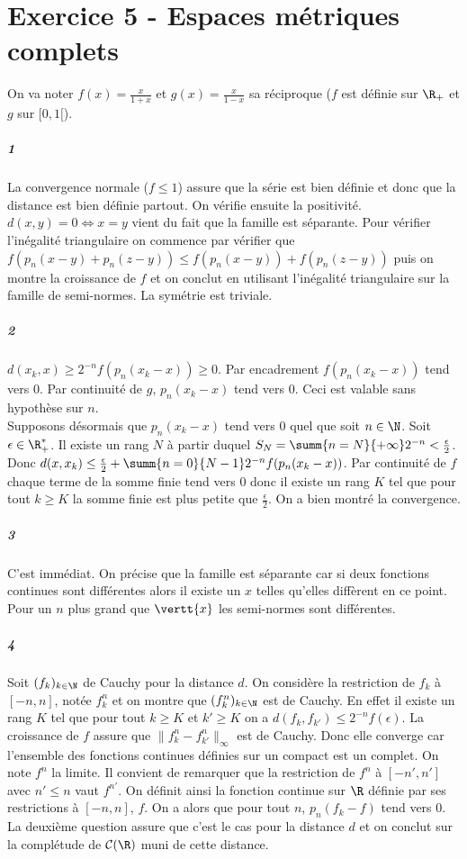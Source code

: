 \documentclass[10pt,a4paper]{article}
\begin{document}
  \section{Exercice 5 - Espaces métriques complets}
  On va noter $f(x) = \frac{x}{1+x}$ et $g(x) = \frac{x}{1-x}$ sa réciproque ($f$ est définie sur $\R_+$ et $g$ sur $[0,1[$).
  \subparagraph{1}La convergence normale ($f\le 1$) assure que la série est bien définie et donc que la distance est bien définie partout. On vérifie ensuite la positivité. $d(x,y) = 0 \Leftrightarrow x=y$ vient du fait que la famille est séparante. Pour vérifier l'inégalité triangulaire on commence par vérifier que $f(p_n(x-y)+p_n(z-y)) \le f(p_n(x-y)) + f(p_n(z-y))$ puis on montre la croissance de $f$ et on conclut en utilisant l'inégalité triangulaire sur la famille de semi-normes. La symétrie est triviale.
  \subparagraph{2}$d(x_k,x) \ge 2^{-n}f(p_n(x_k-x)) \ge 0$. Par encadrement $f(p_n(x_k-x))$ tend vers $0$. Par continuité de $g$, $p_n(x_k-x)$ tend vers $0$. Ceci est valable sans hypothèse sur $n$.\\
  Supposons désormais que $p_n(x_k-x)$ tend vers $0$ quel que soit $n \in \N$. Soit $\epsilon \in \R_+^*$. Il existe un rang $N$ à partir duquel $S_N = \summ{n = N}{+\infty} 2^{-n} < \frac{\epsilon}{2}$. Donc $d(x,x_k) \le \frac{\epsilon}{2} + \summ{n=0}{N-1} 2^{-n}f(p_n(x_k-x))$. Par continuité de $f$ chaque terme de la somme finie tend vers $0$ donc il existe un rang $K$ tel que pour tout $k \ge K$ la somme finie est plus petite que $\frac{\epsilon}{2}$. On a bien montré la convergence.
  \subparagraph{3}C'est immédiat. On précise que la famille est séparante car si deux fonctions continues sont différentes alors il existe un $x$ telles qu'elles diffèrent en ce point. Pour un $n$ plus grand que $\vertt{x}$ les semi-normes sont différentes.
  \subparagraph{4}Soit $(f_k)_{k \in \N}$ de Cauchy pour la distance $d$. On considère la restriction de $f_k$ à $[-n,n]$, notée $f_k^n$ et on montre que $(f_k^n)_{k \in \N}$ est de Cauchy. En effet il existe un rang $K$ tel que pour tout $k \ge K$ et $k' \ge K$ on a $d(f_k,f_{k'}) \le 2^{-n}f(\epsilon)$. La croissance de $f$ assure que $\|f_k^n - f_{k'}^n\|_{\infty}$ est de Cauchy. Donc elle converge car l'ensemble des fonctions continues définies sur un compact est un complet. On note $f^n$ la limite. Il convient de remarquer que la restriction de $f^n$ à $[-n',n']$ avec $n' \le n$ vaut $f^{n'}$. On définit ainsi la fonction continue sur $\R$ définie par ses restrictions à $[-n,n]$, $f$. On a alors que pour tout $n$, $p_n(f_k-f)$ tend vers $0$. La deuxième question assure que c'est le cas pour la distance $d$ et on conclut sur la complétude de $\mathcal{C}(\R)$ muni de cette distance.
\end{document}
